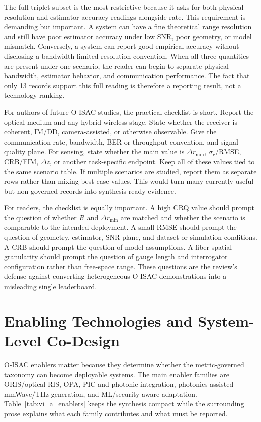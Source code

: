 \documentclass[letterpaper,journal]{IEEEtran}
\begin{document}
The full-triplet subset is the most restrictive because it asks for both physical-resolution and estimator-accuracy readings alongside rate. This requirement is demanding but important. A system can have a fine theoretical range resolution and still have poor estimator accuracy under low SNR, poor geometry, or model mismatch. Conversely, a system can report good empirical accuracy without disclosing a bandwidth-limited resolution convention. When all three quantities are present under one scenario, the reader can begin to separate physical bandwidth, estimator behavior, and communication performance. The fact that only 13 records support this full reading is therefore a reporting result, not a technology ranking.

For authors of future O-ISAC studies, the practical checklist is short. Report the optical medium and any hybrid wireless stage. State whether the receiver is coherent, IM/DD, camera-assisted, or otherwise observable. Give the communication rate, bandwidth, BER or throughput convention, and signal-quality plane. For sensing, state whether the main value is $\Delta r_{\min}$, $\sigma_r$/RMSE, CRB/FIM, $\Delta z$, or another task-specific endpoint. Keep all of these values tied to the same scenario table. If multiple scenarios are studied, report them as separate rows rather than mixing best-case values. This would turn many currently useful but non-governed records into synthesis-ready evidence.

For readers, the checklist is equally important. A high CRQ value should prompt the question of whether \(R\) and \(\Delta r_{\min}\) are matched and whether the scenario is comparable to the intended deployment. A small RMSE should prompt the question of geometry, estimator, SNR plane, and dataset or simulation conditions. A CRB should prompt the question of model assumptions. A fiber spatial granularity should prompt the question of gauge length and interrogator configuration rather than free-space range. These questions are the review's defense against converting heterogeneous O-ISAC demonstrations into a misleading single leaderboard.

\section{Enabling Technologies and System-Level Co-Design}
\label{sec:enablers}

O-ISAC enablers matter because they determine whether the metric-governed taxonomy can become deployable systems. The main enabler families are ORIS/optical RIS, OPA, PIC and photonic integration, photonics-assisted mmWave/THz generation, and ML/security-aware adaptation. Table~\ref{tab:vi_a_enablers} keeps the synthesis compact while the surrounding prose explains what each family contributes and what must be reported.
\end{document}
